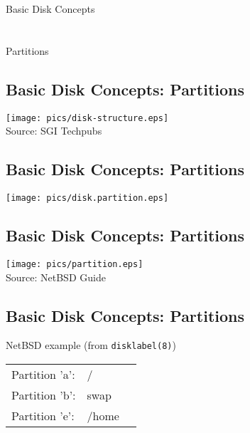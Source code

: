 \documentclass[xga]{xdvislides}
\begin{document}
\newpage
\vspace*{\fill}
\begin{center}
	\Hugesize
		Basic Disk Concepts\\ [1em]
	\hspace*{5mm}
	\blueline\\
	\hspace*{5mm}\\
		Partitions
\end{center}
\vspace*{\fill}

\subsection{Basic Disk Concepts: Partitions}
	\begin{center}
		\texttt{[image: pics/disk-structure.eps]} \\
		\tiny Source: SGI Techpubs \\
	\end{center}

\subsection{Basic Disk Concepts: Partitions}
	\begin{center}
		\texttt{[image: pics/disk.partition.eps]}
	\end{center}


\subsection{Basic Disk Concepts: Partitions}
	\begin{center}
		\texttt{[image: pics/partition.eps]} \\
		\tiny Source: NetBSD Guide \\
	\end{center}

\subsection{Basic Disk Concepts: Partitions}
NetBSD example (from {\tt disklabel(8)})

\begin{tabular}{ l l c }
Partition 'a': & / & \\
Partition 'b': & swap & \\
Partition 'e': & /home & \\
\end{tabular}
\end{document}
